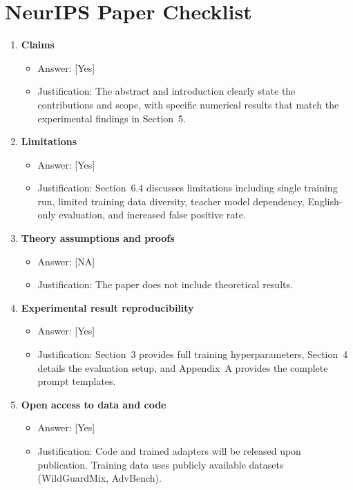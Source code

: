 \documentclass[11pt]{article}
\begin{document}

\newpage
\section*{NeurIPS Paper Checklist}

\begin{enumerate}[leftmargin=*]

\item \textbf{Claims}
\begin{itemize}
  \item[] Answer: [Yes]
  \item[] Justification: The abstract and introduction clearly state the contributions and scope, with specific numerical results that match the experimental findings in Section~5.
\end{itemize}

\item \textbf{Limitations}
\begin{itemize}
  \item[] Answer: [Yes]
  \item[] Justification: Section~6.4 discusses limitations including single training run, limited training data diversity, teacher model dependency, English-only evaluation, and increased false positive rate.
\end{itemize}

\item \textbf{Theory assumptions and proofs}
\begin{itemize}
  \item[] Answer: [NA]
  \item[] Justification: The paper does not include theoretical results.
\end{itemize}

\item \textbf{Experimental result reproducibility}
\begin{itemize}
  \item[] Answer: [Yes]
  \item[] Justification: Section~3 provides full training hyperparameters, Section~4 details the evaluation setup, and Appendix~A provides the complete prompt templates.
\end{itemize}

\item \textbf{Open access to data and code}
\begin{itemize}
  \item[] Answer: [Yes]
  \item[] Justification: Code and trained adapters will be released upon publication. Training data uses publicly available datasets (WildGuardMix, AdvBench).
\end{itemize}


\end{enumerate}
\end{document}
